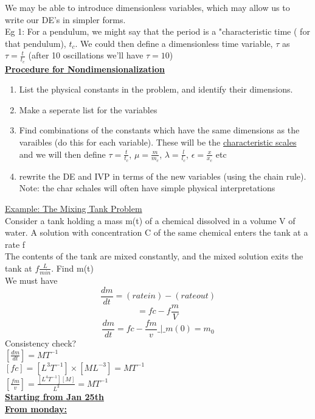 \documentclass[12pt]{article}
\newcommand{\myt}[1]{\textbf{\underline{#1}}}
\begin{document}
	We may be able to introduce dimensionless variables, which may allow us to write our DE's in simpler forms.\\
	Eg 1: For a pendulum, we might say that the period is a "characteristic time ( for that pendulum), $t_c$. We could then define a dimensionless time variable, $\tau$ as $\tau = \frac{t}{t_c}$ (after 10 oscillations we'll have $\tau = 10$)\\
	
	\myt{Procedure for Nondimensionalization}\\
	\begin{enumerate}
		\item List the physical constants in the problem, and identify their dimensions.
		\item Make a seperate list for the variables
		\item Find combinations of the constants which have the same dimensions as the varaibles (do this for each variable). These will be the \underline{characteristic scales} and we will then define $\tau = \frac{t}{t_c}$, $\mu = \frac{m}{m_c}$, $\lambda = \frac{l}{l_c}$, $\epsilon = \frac{x}{x_c}$ etc
		\item rewrite the DE and IVP in terms of the new variables (using the chain rule). Note: the char schales will often have simple physical interpretations
	\end{enumerate}
	
	\underline{Example: The Mixing Tank Problem}\\
	Consider a tank holding a mass m(t) of a chemical dissolved in a volume V of water. A solution with concentration C of the same chemical enters the tank at a rate f\\
	
	The contents of the tank are mixed constantly, and the mixed solution exits the tank at $f \frac{L}{min}$. Find m(t)\\
	
	We must have 
	$$\frac{dm}{dt} = (rate in) - (rate out)$$
	$$= fc - f\frac{m}{V}$$
	$$\frac{dm}{dt} = fc - \frac{fm}{v} \_|\_ m(0) = m_0$$
	Consistency check?\\
	$[\frac{dm}{dt}] = MT^{-1}$\\
	$[fc] = [L^3T^{-1}] \times [ML^{-3}] = MT^{-1}$\\
	$[\frac{fm}{v}] = \frac{[L^4T^{-1}][M]}{L^3} = MT^{-1}$\\
	
	\myt{Starting from Jan 25th}\\
	\myt{From monday:}\\
	
\end{document}
